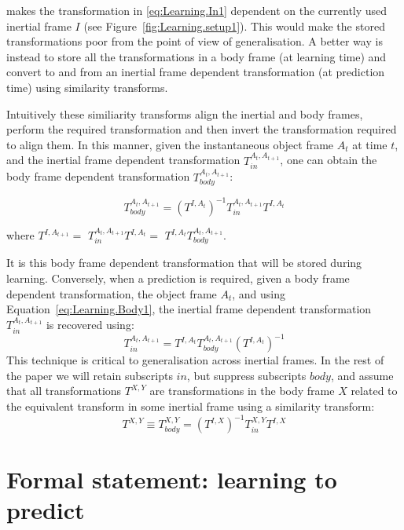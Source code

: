 \noindent makes the transformation in \eqref{eq:Learning.In1} dependent on the currently used inertial frame $I$ (see
Figure~\ref{fig:Learning.setup1}).  This would make the stored transformations poor from the point of view of generalisation. A better way is instead to store all the transformations in a body frame (at learning time) and convert to and from an inertial frame dependent transformation (at prediction time) using similarity transforms.

Intuitively these similiarity transforms align the inertial and body frames, perform the
required transformation and then invert the transformation required to
align them. In this manner, given the instantaneous object frame
$A_{t}$ at time $t$, and the inertial frame dependent transformation
$T_{in}^{A_{t}, A_{t+1}}$, one can obtain the body frame dependent
transformation $T_{body}^{A_{t}, A_{t+1}}$:

\begin{equation}
T_{body}^{A_{t}, A_{t+1}} = (T^{I, A_{t}})^{-1} T_{in}^{A_{t}, A_{t+1}} T^{I, A_{t}}
\label{eq:Learning.Body1}
\end{equation}

\noindent where $T^{I, A_{t+1}} =$ $T_{in}^{A_{t}, A_{t+1}} T^{I, A_{t}} =$ $T^{I, A_{t}} T_{body}^{A_{t}, A_{t+1}}$.

It is this body frame dependent transformation that will be stored during learning. Conversely, when a prediction is required, given a body frame dependent transformation, the object
frame $A_{t}$, and using Equation~\eqref{eq:Learning.Body1}, the
inertial frame dependent transformation $T_{in}^{A_{t}, A_{t+1}}$ is
recovered using:
\begin{equation}
T_{in}^{A_{t}, A_{t+1}} = T^{I, A_{t}} T_{body}^{A_{t}, A_{t+1}} (T^{I, A_{t}})^{-1}
\label{eq:Learning.Body2}
\end{equation}
This technique is critical to generalisation across inertial frames. In the rest of the paper we will retain subscripts $in$, but suppress subscripts $body$, and assume that all transformations $T^{X, Y}$ are transformations in the body frame $X$ related to the equivalent transform in some inertial frame using a similarity transform:
\begin{equation}
T^{X, Y} \equiv T_{body}^{X, Y} = ({T^{I, X}})^{-1} T_{in}^{X, Y} {T^{I, X}}
\label{eq:Learning.Similarity}
\end{equation}

\section{Formal statement: learning to predict}
\label{sec:PredictionProblem}

